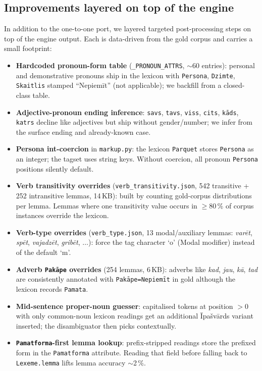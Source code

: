 \documentclass[11pt,a4paper]{article}
\begin{document}
\subsection{Improvements layered on top of the engine}

In addition to the one-to-one port, we layered targeted post-processing
steps on top of the engine output. Each is data-driven from the gold
corpus and carries a small footprint:

\begin{itemize}
\item \textbf{Hardcoded pronoun-form table} (\verb|_PRONOUN_ATTRS|,
  $\sim$60 entries): personal and demonstrative pronouns ship in the lexicon
  with \verb|Persona|, \verb|Dzimte|, \verb|Skaitlis| stamped
  ``Nepiemīt'' (not applicable); we backfill from a closed-class table.
\item \textbf{Adjective-pronoun ending inference}: \texttt{savs}, \texttt{tavs},
  \texttt{viss}, \texttt{cits}, \texttt{kāds}, \texttt{katrs} decline like
  adjectives but ship without gender/number; we infer from the surface ending
  and already-known case.
\item \textbf{Persona int-coercion} in \texttt{markup.py}: the lexicon
  \texttt{Parquet} stores \texttt{Persona} as an integer; the tagset uses
  string keys. Without coercion, all pronoun \texttt{Persona} positions
  silently default.
\item \textbf{Verb transitivity overrides} (\texttt{verb\_transitivity.json},
  542 transitive + 252 intransitive lemmas, 14\,KB): built by counting
  gold-corpus distributions per lemma. Lemmas where one transitivity value
  occurs in $\geq$80\,\% of corpus instances override the lexicon.
\item \textbf{Verb-type overrides} (\texttt{verb\_type.json}, 13 modal/auxiliary
  lemmas: \textit{varēt}, \textit{spēt}, \textit{vajadzēt}, \textit{gribēt},
  $\dots$): force the tag character `o' (Modal modifier) instead of the
  default `m'.
\item \textbf{Adverb \texttt{Pakāpe} overrides} (254 lemmas, 6\,KB): adverbs
  like \textit{kad}, \textit{jau}, \textit{kā}, \textit{tad} are consistently
  annotated with \texttt{Pakāpe=Nepiemīt} in gold although the lexicon
  records \texttt{Pamata}.
\item \textbf{Mid-sentence proper-noun guesser}: capitalised tokens at
  position $>0$ with only common-noun lexicon readings get an additional
  Īpašvārds variant inserted; the disambiguator then picks contextually.
\item \textbf{\texttt{Pamatforma}-first lemma lookup}: prefix-stripped readings
  store the prefixed form in the \texttt{Pamatforma} attribute. Reading that
  field before falling back to \texttt{Lexeme.lemma} lifts lemma accuracy
  $\sim$2\,\%.
\end{itemize}
\end{document}

